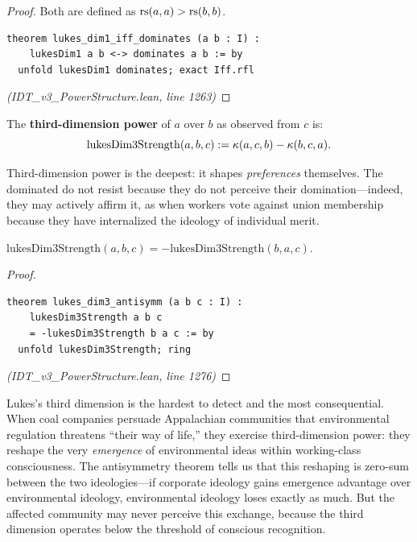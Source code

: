 \begin{proof}
Both are defined as $\mathrm{rs}(a,a) > \mathrm{rs}(b,b)$.
\begin{lstlisting}
theorem lukes_dim1_iff_dominates (a b : I) :
    lukesDim1 a b <-> dominates a b := by
  unfold lukesDim1 dominates; exact Iff.rfl
\end{lstlisting}
\textit{(IDT\_v3\_PowerStructure.lean, line 1263)}
\end{proof}

\begin{definition}
\label{def:lukes-dim3}
The \textbf{third-dimension power} of $a$ over $b$ as observed from $c$ is:
\[
  \mathrm{lukesDim3Strength}(a, b, c) := \kappa(a, c, b) - \kappa(b, c, a).
\]
\end{definition}

Third-dimension power is the deepest: it shapes \emph{preferences} themselves.
The dominated do not resist because they do not perceive their domination---indeed,
they may actively affirm it, as when workers vote against union membership
because they have internalized the ideology of individual merit.

\begin{theorem}
\label{thm:lukes-dim3-antisymm}
$\mathrm{lukesDim3Strength}(a, b, c) = -\mathrm{lukesDim3Strength}(b, a, c)$.
\end{theorem}

\begin{proof}
\begin{lstlisting}
theorem lukes_dim3_antisymm (a b c : I) :
    lukesDim3Strength a b c
    = -lukesDim3Strength b a c := by
  unfold lukesDim3Strength; ring
\end{lstlisting}
\textit{(IDT\_v3\_PowerStructure.lean, line 1276)}
\end{proof}

\begin{interpretation}
Lukes's third dimension is the hardest to detect and the most consequential.
When coal companies persuade Appalachian communities that environmental
regulation threatens ``their way of life,'' they exercise third-dimension
power: they reshape the very \emph{emergence} of environmental ideas within
working-class consciousness. The antisymmetry theorem tells us that this
reshaping is zero-sum between the two ideologies---if corporate ideology
gains emergence advantage over environmental ideology, environmental ideology
loses exactly as much. But the affected community may never perceive this
exchange, because the third dimension operates below the threshold of
conscious recognition.
\end{interpretation}

